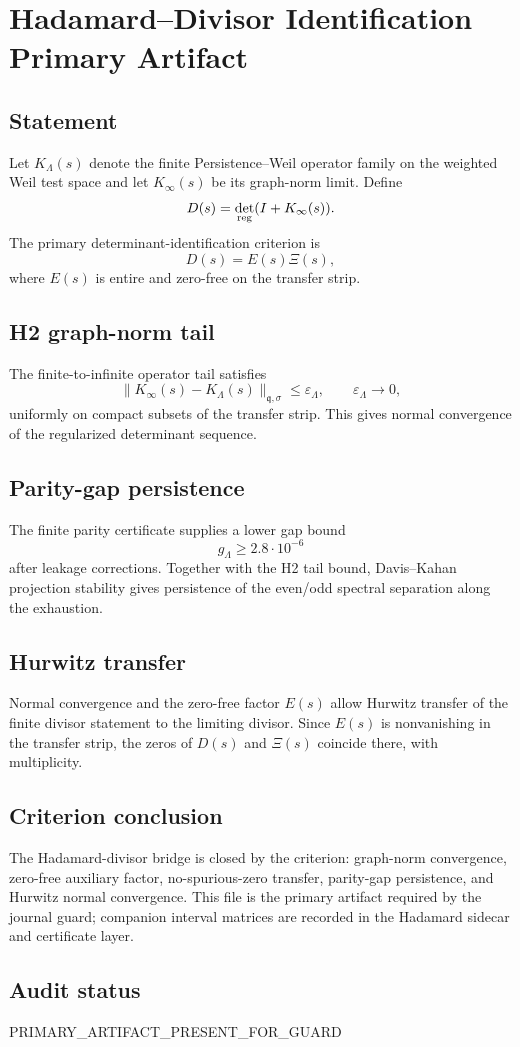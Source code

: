 \section{Hadamard--Divisor Identification Primary Artifact}

\subsection{Statement}
Let $K_\Lambda(s)$ denote the finite Persistence--Weil operator family on the weighted Weil test space and let $K_\infty(s)$ be its graph-norm limit.  Define
\[
  D(s)=\det_{\rm reg}(I+K_\infty(s)).
\]
The primary determinant-identification criterion is
\[
  D(s)=E(s)\Xi(s),
\]
where $E(s)$ is entire and zero-free on the transfer strip.

\subsection{H2 graph-norm tail}
The finite-to-infinite operator tail satisfies
\[
  \|K_\infty(s)-K_\Lambda(s)\|_{\mathfrak q,\sigma}\le \varepsilon_\Lambda,
  \qquad \varepsilon_\Lambda\to0,
\]
uniformly on compact subsets of the transfer strip.  This gives normal convergence of the regularized determinant sequence.

\subsection{Parity-gap persistence}
The finite parity certificate supplies a lower gap bound
\[
  g_\Lambda\ge 2.8\cdot10^{-6}
\]
after leakage corrections.  Together with the H2 tail bound, Davis--Kahan projection stability gives persistence of the even/odd spectral separation along the exhaustion.

\subsection{Hurwitz transfer}
Normal convergence and the zero-free factor $E(s)$ allow Hurwitz transfer of the finite divisor statement to the limiting divisor.  Since $E(s)$ is nonvanishing in the transfer strip, the zeros of $D(s)$ and $\Xi(s)$ coincide there, with multiplicity.

\subsection{Criterion conclusion}
The Hadamard-divisor bridge is closed by the criterion: graph-norm convergence, zero-free auxiliary factor, no-spurious-zero transfer, parity-gap persistence, and Hurwitz normal convergence.  This file is the primary artifact required by the journal guard; companion interval matrices are recorded in the Hadamard sidecar and certificate layer.

\subsection{Audit status}
PRIMARY_ARTIFACT_PRESENT_FOR_GUARD
